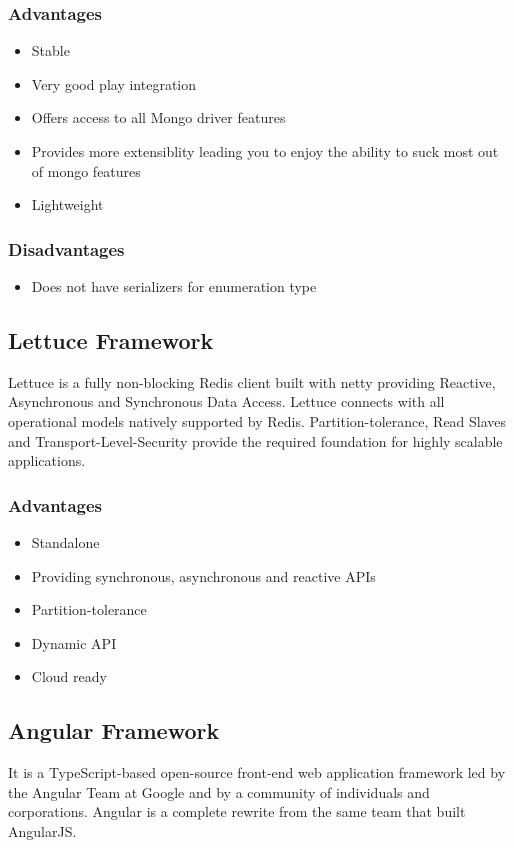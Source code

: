 \documentclass[a4paper, hidelinks, 12pt]{report}
\begin{document}
\subsubsection{Advantages}

		\begin{itemize}
		\item{} Stable
	\item{} Very good play integration
	\item{} Offers access to all Mongo driver features
	\item{} Provides more extensiblity leading you to enjoy the ability to suck most out of mongo features
	\item{} Lightweight
		\end{itemize}
\subsubsection{Disadvantages}
			\begin{itemize}
		\item{} Does not have serializers for enumeration type
		\end{itemize}
		
\subsection{Lettuce Framework} Lettuce is a fully non-blocking Redis client built with netty providing Reactive, Asynchronous and Synchronous Data Access. Lettuce connects with all operational models natively supported by Redis. Partition-tolerance, Read Slaves and Transport-Level-Security provide the required foundation for highly scalable applications.
\subsubsection{Advantages}
\begin{itemize}
\item{} Standalone
\item{} Providing synchronous, asynchronous and reactive APIs
\item{} Partition-tolerance
\item{} Dynamic API
\item{} Cloud ready
\end{itemize}


\subsection{Angular Framework} It is a TypeScript-based open-source front-end web application framework led by the Angular Team at Google and by a community of individuals and corporations. Angular is a complete rewrite from the same team that built AngularJS.
\end{document}
